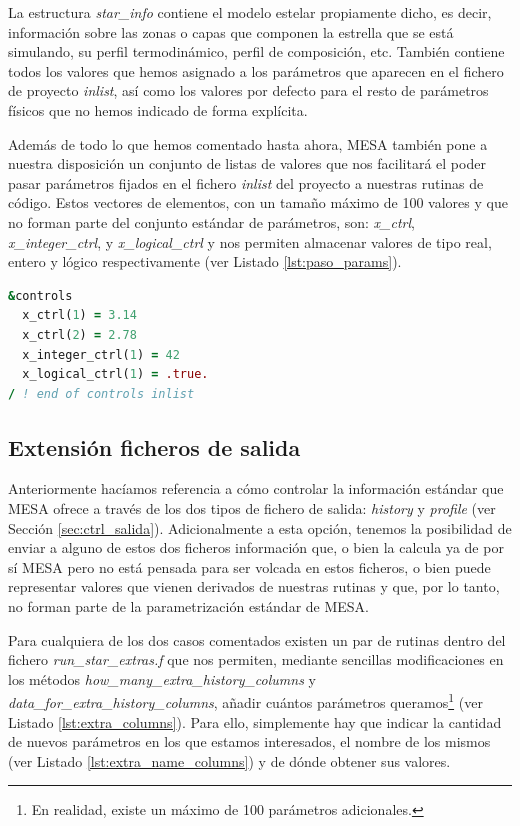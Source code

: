 La estructura \textit{star\_info} contiene el modelo estelar propiamente dicho, es decir, información sobre las zonas o capas que componen la estrella que se está simulando, su perfil termodinámico, perfil de composición, etc. También contiene todos los valores que hemos asignado a los parámetros que aparecen en el fichero de proyecto \textit{inlist}, así como los valores por defecto para el resto de parámetros físicos que no hemos indicado de forma explícita.\par

Además de todo lo que hemos comentado hasta ahora, MESA también pone a nuestra disposición un conjunto de listas de valores que nos facilitará el poder pasar parámetros fijados en el fichero \textit{inlist} del proyecto a nuestras rutinas de código. Estos vectores de elementos, con un tamaño máximo de 100 valores y que no forman parte del conjunto estándar de parámetros, son: \textit{x\_ctrl}, \textit{x\_integer\_ctrl}, y \textit{x\_logical\_ctrl} y nos permiten almacenar valores de tipo real, entero y lógico respectivamente (ver Listado \ref{lst:paso_params}).\par

\begin{lstlisting}[language=Fortran, float, caption={Paso de parámetros no estándar a través del fichero de proyecto inlist}, label={lst:paso_params}]
&controls
  x_ctrl(1) = 3.14
  x_ctrl(2) = 2.78
  x_integer_ctrl(1) = 42
  x_logical_ctrl(1) = .true.
/ ! end of controls inlist
\end{lstlisting}

\subsection{Extensión ficheros de salida}
Anteriormente hacíamos referencia a cómo controlar la información estándar que MESA ofrece a través de los dos tipos de fichero de salida: \textit{history} y \textit{profile} (ver Sección \ref{sec:ctrl_salida}). Adicionalmente a esta opción, tenemos la posibilidad de enviar a alguno de estos dos ficheros información que, o bien la calcula ya de por sí MESA pero no está pensada para ser volcada en estos ficheros, o bien puede representar valores que vienen derivados de nuestras rutinas y que, por lo tanto, no forman parte de la parametrización estándar de MESA.\par

Para cualquiera de los dos casos comentados existen un par de rutinas dentro del fichero \textit{run\_star\_extras.f} que nos permiten, mediante sencillas modificaciones en los métodos \textit{how\_many\_extra\_history\_columns} y \textit{data\_for\_extra\_history\_columns}, añadir cuántos parámetros queramos\footnote{En realidad, existe un máximo de 100 parámetros adicionales.} (ver Listado \ref{lst:extra_columns}). Para ello, simplemente hay que indicar la cantidad de nuevos parámetros en los que estamos interesados, el nombre de los mismos (ver Listado \ref{lst:extra_name_columns}) y de dónde obtener sus valores.\par


